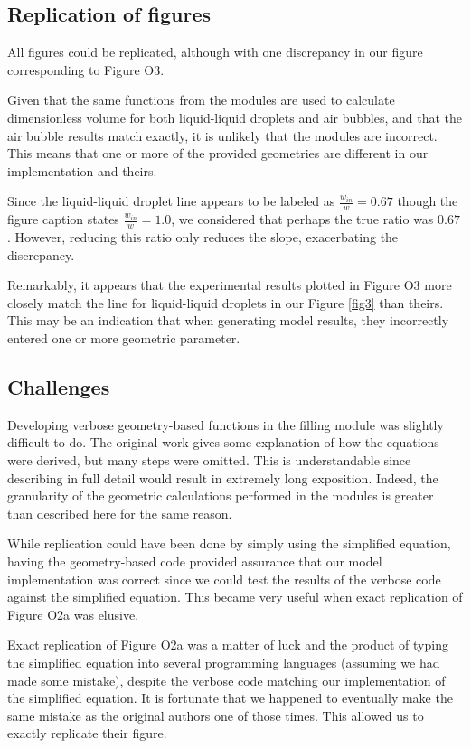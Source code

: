 \subsection{Replication of figures}

All figures could be replicated, although with one discrepancy in our figure corresponding to 
Figure O3.

Given that the same functions from the modules are used to calculate dimensionless volume for both
liquid-liquid droplets and air bubbles, and that the air bubble results match exactly, it is
unlikely that the modules are incorrect. This means that one or more of the provided geometries
are different in our implementation and theirs.

Since the liquid-liquid droplet line appears to be labeled
as $\frac{w_{in}}{w}=0.67$ though the figure caption states $\frac{w_{in}}{w}=1.0$, we considered that
perhaps the true ratio was $0.67$. However, reducing this ratio only reduces the slope,
exacerbating the discrepancy.

Remarkably, it appears that the experimental results plotted in Figure O3
more closely match the line for liquid-liquid droplets in our Figure \ref{fig3}
than theirs. This may be an indication that when generating model results, they incorrectly
entered one or more geometric parameter.

\subsection{Challenges}

Developing verbose geometry-based functions in the filling module was slightly difficult to do.
The original work gives some explanation of how the equations were derived, but many steps were
omitted. This is understandable since describing in full detail would result in extremely long
exposition. Indeed, the granularity of the geometric calculations performed in the modules
is greater than described here for the same reason.

While replication could have been done by simply using the simplified equation, having
the geometry-based code provided assurance that our model implementation was correct since
we could test the results of the verbose code against the simplified equation. This became very
useful when exact replication of Figure O2a was elusive.

Exact replication of Figure O2a was a matter of luck and the product of typing the simplified
equation into several programming languages (assuming we had made some mistake), despite the
verbose code matching our implementation of the simplified equation. It is fortunate that we
happened to eventually make the same mistake as the original authors one of those times. This
allowed us to exactly replicate their figure.


